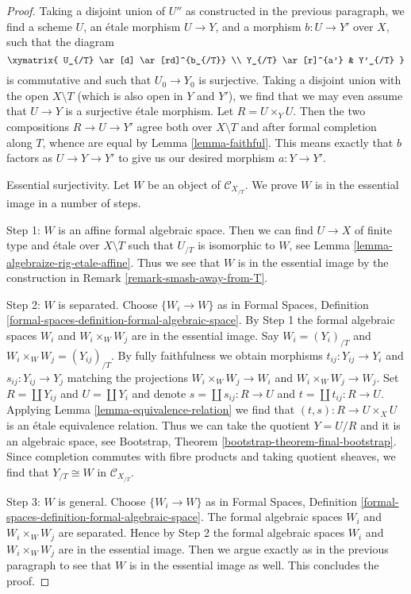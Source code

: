 \begin{proof}
\medskip\noindent
Taking a disjoint union of $U''$ as constructed in the previous
paragraph, we find a scheme $U$, an \'etale morphism $U \to Y$,
and a morphism $b : U \to Y'$ over $X$, such that the diagram
$$
\xymatrix{
U_{/T} \ar[d] \ar[rd]^{b_{/T}} \\
Y_{/T} \ar[r]^{a'} & Y'_{/T}
}
$$
is commutative and such that $U_0 \to Y_0$ is surjective.
Taking a disjoint union with the open $X \setminus T$ (which is also
open in $Y$ and $Y'$), we find that we may even assume that $U \to Y$
is a surjective \'etale morphism. Let $R = U \times_Y U$.
Then the two compositions $R \to U \to Y'$ agree both over $X \setminus T$
and after formal completion along $T$, whence are equal by
Lemma \ref{lemma-faithful}. This means exactly that $b$ factors as
$U \to Y \to Y'$ to give us our desired morphism $a : Y \to Y'$.

\medskip\noindent
Essential surjectivity. Let $W$ be an object of $\mathcal{C}_{X_{/T}}$.
We prove $W$ is in the essential image in a number of steps.

\medskip\noindent
Step 1: $W$ is an affine formal algebraic space. Then we can find
$U \to X$ of finite type and \'etale over $X \setminus T$ such that
$U_{/T}$ is isomorphic to $W$, see
Lemma \ref{lemma-algebraize-rig-etale-affine}.
Thus we see that $W$ is in the essential image by the construction
in Remark \ref{remark-smash-away-from-T}.

\medskip\noindent
Step 2: $W$ is separated. Choose $\{W_i \to W\}$ as in
Formal Spaces, Definition \ref{formal-spaces-definition-formal-algebraic-space}.
By Step 1 the formal algebraic spaces $W_i$ and $W_i \times_W W_j$
are in the essential image.
Say $W_i = (Y_i)_{/T}$ and $W_i \times_W W_j = (Y_{ij})_{/T}$.
By fully faithfulness we obtain morphisms $t_{ij} : Y_{ij} \to Y_i$
and $s_{ij} : Y_{ij} \to Y_j$ matching the projections
$W_i \times_W W_j \to W_i$ and $W_i \times_W W_j \to W_j$.
Set $R = \coprod Y_{ij}$ and $U = \coprod Y_i$ and denote
$s = \coprod s_{ij} : R \to U$ and $t = \coprod t_{ij} : R \to U$.
Applying Lemma \ref{lemma-equivalence-relation}
we find that $(t, s) : R \to U \times_X U$ is an \'etale equivalence relation.
Thus we can take the quotient $Y = U/R$ and it is an algebraic
space, see 
Bootstrap, Theorem \ref{bootstrap-theorem-final-bootstrap}.
Since completion commutes with fibre products and taking
quotient sheaves, we find that $Y_{/T} \cong W$ in $\mathcal{C}_{X_{/T}}$.

\medskip\noindent
Step 3: $W$ is general. Choose $\{W_i \to W\}$ as in
Formal Spaces, Definition \ref{formal-spaces-definition-formal-algebraic-space}.
The formal algebraic spaces $W_i$ and $W_i \times_W W_j$ are separated.
Hence by Step 2  the formal algebraic spaces $W_i$ and $W_i \times_W W_j$
are in the essential image. Then we argue exactly as in the previous
paragraph to see that $W$ is in the essential image as well.
This concludes the proof.
\end{proof}

